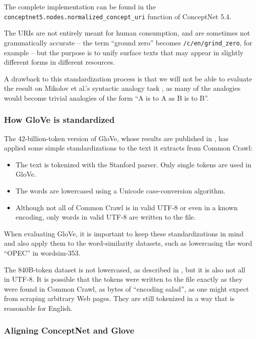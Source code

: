 \documentclass[letterpaper]{article}
\begin{document}
The complete implementation can be found in the
{\tt conceptnet5.nodes.normalized\_concept\_uri} function of ConceptNet 5.4.

The URIs are not entirely meant for human consumption, and are
sometimes not grammatically accurate -- the term ``ground zero'' becomes
{\tt /c/en/grind\_zero}, for example -- but the purpose is to unify
surface texts that may appear in slightly different forms in different
resources.

A drawback to this standardization process is that we will not be able
to evaluate the result on Mikolov et al.'s syntactic analogy task
\cite{mikolov2013word2vec}, as many of the analogies would become trivial
analogies of the form ``A is to A as B is to B''.

\subsubsection{How GloVe is standardized}

The 42-billion-token version of GloVe, whose results are published in
\cite{pennington2014glove}, has applied some simple standardizations
to the text it extracts from Common Crawl:

\begin{itemize}
\item The text is tokenized with the Stanford parser. Only single tokens are
    used in GloVe.
\item The words are lowercased using a Unicode case-conversion
    algorithm.
\item Although not all of Common Crawl is in valid UTF-8 or even in a known
    encoding, only words in valid UTF-8 are written to the file.
\end{itemize}

When evaluating GloVe, it is important to keep these standardizations in mind
and also apply them to the word-similarity datasets, such as lowercasing the
word ``OPEC'' in {\sc wordsim-353}.

The 840B-token dataset is not lowercased, as described in
\cite{pennington2014glove}, but it is also not all in UTF-8. It is possible
that the tokens were written to the file exactly as they were found in
Common Crawl, as bytes of ``encoding salad'', as one might expect from
scraping arbitrary Web pages. They are still tokenized in a way that is
reasonable for English.

\subsubsection{Aligning ConceptNet and Glove}
\end{document}
